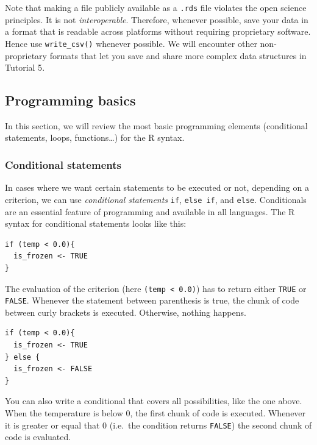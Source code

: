 \documentclass[
]{book}
\begin{document}
Note that making a file publicly available as a \texttt{.rds} file violates the open science principles. It is not \emph{interoperable}. Therefore, whenever possible, save your data in a format that is readable across platforms without requiring proprietary software. Hence use \texttt{write\_csv()} whenever possible. We will encounter other non-proprietary formats that let you save and share more complex data structures in \protect\hypertarget{data_variety}{}{Tutorial 5}.

\hypertarget{programming-basics}{%
\subsection{Programming basics}\label{programming-basics}}

In this section, we will review the most basic programming elements (conditional statements, loops, functions\ldots) for the R syntax.

\hypertarget{conditional-statements}{%
\subsubsection{Conditional statements}\label{conditional-statements}}

In cases where we want certain statements to be executed or not, depending on a criterion, we can use \emph{conditional statements} \texttt{if}, \texttt{else\ if}, and \texttt{else}. Conditionals are an essential feature of programming and available in all languages. The R syntax for conditional statements looks like this:

\begin{verbatim}
if (temp < 0.0){
  is_frozen <- TRUE
}
\end{verbatim}

The evaluation of the criterion (here \texttt{(temp\ \textless{}\ 0.0)}) has to return either \texttt{TRUE} or \texttt{FALSE}. Whenever the statement between parenthesis is true, the chunk of code between curly brackets is executed. Otherwise, nothing happens.

\begin{verbatim}
if (temp < 0.0){
  is_frozen <- TRUE
} else {
  is_frozen <- FALSE
}
\end{verbatim}

You can also write a conditional that covers all possibilities, like the one above. When the temperature is below 0, the first chunk of code is executed. Whenever it is greater or equal that 0 (i.e.~the condition returns \texttt{FALSE}) the second chunk of code is evaluated.
\end{document}
